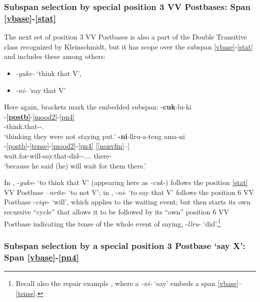 \documentclass[output=paper]{langscibook}
\begin{document}
\subsubsection{Subspan selection by special position 3 VV Postbases: Span \ref{vbase}-\ref{stat}} \label{sec:5.6.3}

The next set of position 3 VV Postbases is also a part of the Double Transitive class recognized by Kleinschmidt, but it has scope over the subspan \ref{vbase}-\ref{stat} and includes these among others:

\begin{itemize}
\item 
\textit{{}-yuke-} `think that V',
\item 
\textit{{}-ni-} `say that V'
\end{itemize}

Here again, brackets mark the embedded subspan:
\ea\label{ex:key:36}
-\textbf{cuk}-lu-ki\\
    [\ref{vbase}-\ref{stat}-]-\textbf{\ref{postb}}{}-\ref{mood2}-\ref{pn4}\\
     [stay.put-not-]-think.that-\Appos-\Tpl.\Obj{}\\
\glt `thinking they were not staying put.'
\z
\ea\label{ex:key:37}
\textbf{-ni}-llru-a-teng ama-ni\\
    [\ref{vbase}-\ref{tense}-]-\ref{postb}-\ref{tense}-\ref{mood2}-\ref{pn4} [\ref{nonvfin}--] \\
     wait.for-will-say.that-did-\Conseq-\Tsg.\Aarg{}.\Third\Refl.\Pl.\Obj{} there-\Loc \\
\glt `because he said (he) will wait for them there.'
\z
\

In , -\textit{yuke}{}- `to think that V' (appearing here as \textit{{}-cuk-}) follows the position \ref{stat} VV Postbase –\textit{nrite}{}- `to not V'; in , -\textit{ni}{}- `to say that V' follows the position 6 VV Postbase -\textit{ciqe}{}- `will', which applies to the waiting event; but then starts its own recursive “cycle” that allows it to be followed by its “own” position 6 VV Postbase indicating the tense of the whole event of saying, -\textit{llru}{}- `did'.\footnote{Recall also the repair example , where a \textit{{}-ni-} `say' embeds a span \ref{vbase}--\ref{tense}.}


\subsubsection{Subspan selection by a special position 3 Postbase `say X': Span \ref{vbase}-\ref{pn4}} \label{sec:5.6.4}
\end{document}
